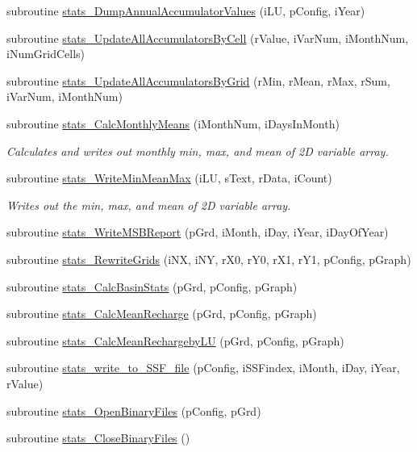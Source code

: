 \begin{DoxyCompactItemize}
\item 
subroutine \hyperlink{namespaceswb__stats_a65f35b2efbf53e65d819a171319d92f9}{stats\_\-DumpAnnualAccumulatorValues} (iLU, pConfig, iYear)
\item 
subroutine \hyperlink{namespaceswb__stats_a6def08584e14bc099756846eab8c3fd0}{stats\_\-UpdateAllAccumulatorsByCell} (rValue, iVarNum, iMonthNum, iNumGridCells)
\item 
subroutine \hyperlink{namespaceswb__stats_a35d0e8e9c65e260e0864eb01bffd2e56}{stats\_\-UpdateAllAccumulatorsByGrid} (rMin, rMean, rMax, rSum, iVarNum, iMonthNum)
\item 
subroutine \hyperlink{namespaceswb__stats_a2a181014514f304c10a4823167eea79a}{stats\_\-CalcMonthlyMeans} (iMonthNum, iDaysInMonth)
\begin{DoxyCompactList}\small\item\em Calculates and writes out monthly min, max, and mean of 2D variable array. \item\end{DoxyCompactList}\item 
subroutine \hyperlink{namespaceswb__stats_ae5f18911e97e0fc1ba46fc24975f03ed}{stats\_\-WriteMinMeanMax} (iLU, sText, rData, iCount)
\begin{DoxyCompactList}\small\item\em Writes out the min, max, and mean of 2D variable array. \item\end{DoxyCompactList}\item 
subroutine \hyperlink{namespaceswb__stats_a477408383e1db8d73b78fabed1b1f805}{stats\_\-WriteMSBReport} (pGrd, iMonth, iDay, iYear, iDayOfYear)
\item 
subroutine \hyperlink{namespaceswb__stats_a62541230c69c255a0beb7c13ea1fd262}{stats\_\-RewriteGrids} (iNX, iNY, rX0, rY0, rX1, rY1, pConfig, pGraph)
\item 
subroutine \hyperlink{namespaceswb__stats_acd278076cc93c0919cda51b7188dab2e}{stats\_\-CalcBasinStats} (pGrd, pConfig, pGraph)
\item 
subroutine \hyperlink{namespaceswb__stats_ad3c6cb80a9c1928e9235d16423bf48d8}{stats\_\-CalcMeanRecharge} (pGrd, pConfig, pGraph)
\item 
subroutine \hyperlink{namespaceswb__stats_aaf222f82f042a1eeb3412be5e5bcd464}{stats\_\-CalcMeanRechargebyLU} (pGrd, pConfig, pGraph)
\item 
subroutine \hyperlink{namespaceswb__stats_a148b78706f8169736ee3fa4a8289a319}{stats\_\-write\_\-to\_\-SSF\_\-file} (pConfig, iSSFindex, iMonth, iDay, iYear, rValue)
\item 
subroutine \hyperlink{namespaceswb__stats_a59a2b9123745126691c28085080584ec}{stats\_\-OpenBinaryFiles} (pConfig, pGrd)
\item 
subroutine \hyperlink{namespaceswb__stats_a841f19be673726e0d221293413ddcae4}{stats\_\-CloseBinaryFiles} ()
\end{DoxyCompactItemize}

